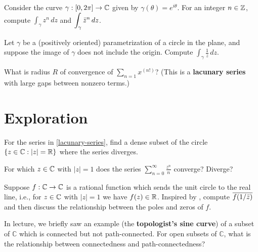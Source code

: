 \documentclass{homework}
\begin{document}
\begin{problem}\label{integral-powers-of-z}Consider the curve $\gamma : [0,2\pi] \to \mathbb{C}$ given by $\gamma(\theta) = e^{i\theta}$.  For an integer $n \in \mathbb{Z}$, compute $\displaystyle\int_\gamma z^n \, dz$ and $\displaystyle\int_\gamma \bar{z}^n \, dz$.
\end{problem}

\begin{problem}\label{one-over-z-around-circle}Let $\gamma$ be a (positively oriented) parametrization of a circle
  in the plane, and suppose the image of $\gamma$ does not include the
  origin.  Compute $\displaystyle\int_\gamma \frac{1}{z} \, dz$.
\end{problem}

\begin{problem}\label{lacunary-series}What is radius $R$ of convergence of
  $\displaystyle\sum_{n=1} x^{(n!)}$?  (This is a \textbf{lacunary
    series} with large gaps between nonzero terms.)
\end{problem}


\section{Exploration}

\begin{problem}For the series in \ref{lacunary-series}, find a dense
  subset of the circle $\{ z \in \mathbb{C} : \left|z\right| = \mathbb{R} \}$ where the series
  diverges.
\end{problem}
  
\begin{problem}
  For which $z \in \mathbb{C}$ with $|z|=1$ does the series
  $\displaystyle\sum_{n=0}^{\infty} \frac{z^n}{n}$ converge?  Diverge?
\end{problem}

\begin{problem}Suppose $f : \mathbb{C} \to \mathbb{C}$ is a rational function which
  sends the unit circle to the real line, i.e., for $z \in \mathbb{C}$ with
  $|z| = 1$ we have $f(z) \in \mathbb{R}$.  Inspired
  by \label{schwarz-reflection-principle}, compute
  $\overline{f(1/\bar{z})}$ and then discuss the relationship between
  the poles and zeros of $f$.
\end{problem}

\begin{problem}In lecture, we briefly saw an example (the
  \textbf{topologist's sine curve}) of a subset of $\mathbb{C}$ which
  is connected but not path-connected.  For open subsets of
  $\mathbb{C}$, what is the relationship between connectedness and
  path-connectedness?
\end{problem}
\end{document}
